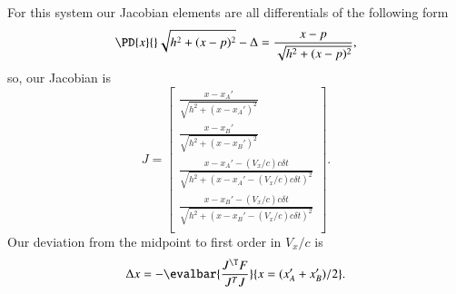 For this system our Jacobian elements are all differentials of the following form
\begin{equation}\label{eqn:relativisticElectrodynamicsA1:370}
\PD{x}{} \sqrt{ h^2 + (x - p)^2 } - \Delta = \frac{x-p}{\sqrt{h^2 + (x-p)^2}},
\end{equation}
so, our Jacobian is
\begin{equation}\label{eqn:relativisticElectrodynamicsA1:380}
J = 
\begin{bmatrix}
\frac{x - x_A'}{\sqrt{ h^2 + (x - x_A')^2 } } \\
\frac{x - x_B'}{\sqrt{ h^2 + (x - x_B')^2 } } \\
\frac{x - x_A' - (V_x/c) c \delta t}{\sqrt{ h^2 + (x - x_A' - (V_x/c) c \delta t)^2 } } \\
\frac{x - x_B' - (V_x/c) c \delta t}{\sqrt{ h^2 + (x - x_B' - (V_x/c) c \delta t)^2 } } \\
\end{bmatrix}.
\end{equation}
Our deviation from the midpoint to first order in \(V_x/c\) is
\begin{equation}\label{eqn:relativisticElectrodynamicsA1:390}
\Delta x = - \evalbar{ \frac{J^\T F}{J^T J} }{x = (x_A' + x_B')/2}.
\end{equation}

